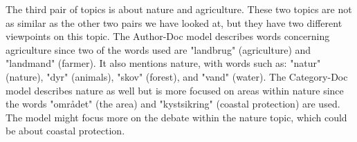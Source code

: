 The third pair of topics is about nature and agriculture.
These two topics are not as similar as the other two pairs we have looked at, but they have two different viewpoints on this topic.
The Author-Doc model describes words concerning agriculture since two of the words used are "landbrug" (agriculture) and "landmand" (farmer). 
It also mentions nature, with words such as: "natur" (nature), "dyr" (animals), "skov" (forest), and "vand" (water).
The Category-Doc model describes nature as well but is more focused on areas within nature since the words "området" (the area) and "kystsikring" (coastal protection) are used.
The model might focus more on the debate within the nature topic, which could be about coastal protection.    
